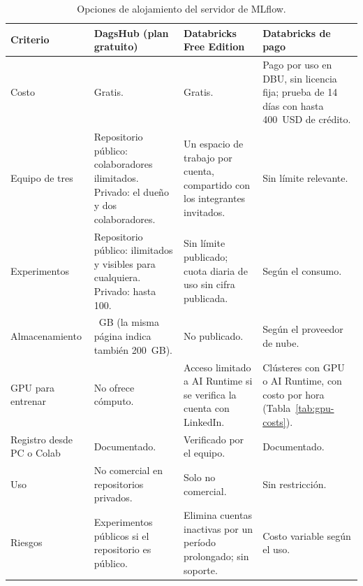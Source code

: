 \begin{table}[htbp]
    \centering
    \caption{Opciones de alojamiento del servidor de MLflow.}%
    \label{tab:mlflow-hosting}
    \small
    \begin{tabularx}{\textwidth}{>{\raggedright\arraybackslash}p{2.8cm}
                                 >{\raggedright\arraybackslash}X
                                 >{\raggedright\arraybackslash}X
                                 >{\raggedright\arraybackslash}X}
        \toprule
        Criterio & DagsHub (plan gratuito) & Databricks Free Edition &
            Databricks de pago \\
        \midrule
        Costo & Gratis. & Gratis. & Pago por uso en DBU, sin licencia fija;
            prueba de 14 días con hasta 400~USD de crédito. \\
        Equipo de tres & Repositorio público: colaboradores ilimitados.
            Privado: el dueño y dos colaboradores. & Un espacio de trabajo por
            cuenta, compartido con los integrantes invitados. & Sin límite
            relevante. \\
        Experimentos & Repositorio público: ilimitados y visibles para
            cualquiera. Privado: hasta 100. & Sin límite publicado; cuota
            diaria de uso sin cifra publicada. & Según el consumo. \\
        Almacenamiento & 20~GB (la misma página indica también 200~GB). &
            No publicado. & Según el proveedor de nube. \\
        GPU para entrenar & No ofrece cómputo. & Acceso limitado a AI Runtime
            si se verifica la cuenta con LinkedIn. & Clústeres con GPU o AI
            Runtime, con costo por hora (Tabla~\ref{tab:gpu-costs}). \\
        Registro desde PC o Colab & Documentado. & Verificado por el equipo.
            & Documentado. \\
        Uso & No comercial en repositorios privados. & Solo no comercial. &
            Sin restricción. \\
        Riesgos & Experimentos públicos si el repositorio es público. &
            Elimina cuentas inactivas por un período prolongado; sin soporte.
            & Costo variable según el uso. \\
        \bottomrule
    \end{tabularx}
\end{table}


